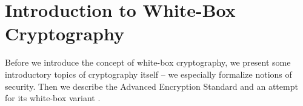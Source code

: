 \chapter{Introduction to White-Box Cryptography}
\label{chap:intro}

Before we introduce the concept of white-box cryptography, we present some introductory topics of cryptography itself -- we especially formalize notions of security. Then we describe the Advanced Encryption Standard \cite{fips2001aes} and an attempt for its white-box variant \cite{chow2002aes}.









